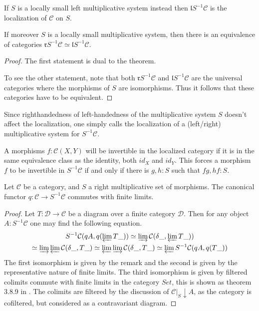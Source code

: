     \begin{corollary}
        If $S$ is a locally small left multiplicative system instead then $\mathfrak{l}S^{-1}\mathcal{C}$ is the localization of $\mathcal{C}$ on $S$.

        If moreover $S$ is a locally small multiplicative system, then there is an equivalence of categories $\mathfrak{r}S^{-1}\mathcal{C}\simeq\mathfrak{l}S^{-1}\mathcal{C}$.
    \end{corollary}

    \begin{proof}
        The first statement is dual to the theorem.

        To see the other statement, note that both $\mathfrak{r}S^{-1}\mathcal{C}$ and $\mathfrak{l}S^{-1}\mathcal{C}$ are the universal categories where the morphisms of $S$ are isomorphisms. Thus it follows that these categories have to be equivalent.
    \end{proof}

    \begin{remark}
        Since righthandedness of left-handedness of the multiplicative system $S$ doesn't affect the localization, one simply calls the localization of a (left/right) multiplicative system for $S^{-1}\mathcal{C}$.
    \end{remark}

    \begin{remark}
        A morphisms $f:\mathcal{C}(X,Y)$ will be invertible in the localized category if it is in the same equivalence class as the identity, both $id_X$ and $id_Y$. This forces a morphism $f$ to be invertible in $S^{-1}\mathcal{C}$ if and only if there is $g,h:S$ such that $fg,hf:S$.
    \end{remark}

    \begin{prop}
        Let $\mathcal{C}$ be a category, and $S$ a right multiplicative set of morphisms. The canonical functor $q:\mathcal{C}\rightarrow S^{-1}\mathcal{C}$ commutes with finite limits.
    \end{prop}

    \begin{proof}
        Let $T:\mathcal{D}\rightarrow\mathcal{C}$ be a diagram over a finite category $\mathcal{D}$. Then for any object $A:S^{-1}\mathcal{C}$ one may find the following equation.
        \begin{multline*}
            S^{-1}\mathcal{C}(qA,q(\varprojlim T\_))\simeq \varinjlim\mathcal{C}(\delta\_,\varprojlim T\_))\\
            \simeq \varinjlim\varprojlim\mathcal{C}(\delta\_,T\_)\simeq \varprojlim\varinjlim\mathcal{C}(\delta\_,T\_)\simeq \varprojlim S^{-1}\mathcal{C}(qA,q(T\_))
        \end{multline*}
        The first isomorphism is given by the remark and the second is given by the representative nature of finite limits. The third isomorphism is given by filtered colimits commute with finite limits in the category $Set$, this is shown as theorem 3.8.9 in \cite{riehl}. The colimits are filtered by the discussion of $\mathcal{C}|_{S}\downarrow A$, as the category is cofiltered, but considered as a contravariant diagram.
    \end{proof}

